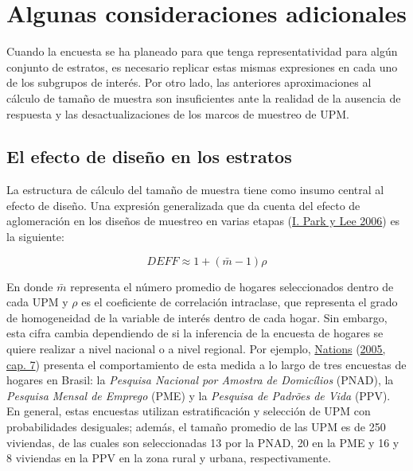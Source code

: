 \documentclass[
  12pt,
  spanish,
]{book}
\begin{document}
\hypertarget{algunas-consideraciones-adicionales}{%
\section{Algunas consideraciones adicionales}\label{algunas-consideraciones-adicionales}}

Cuando la encuesta se ha planeado para que tenga representatividad para algún conjunto de estratos, es necesario replicar estas mismas expresiones en cada uno de los subgrupos de interés. Por otro lado, las anteriores aproximaciones al cálculo de tamaño de muestra son insuficientes ante la realidad de la ausencia de respuesta y las desactualizaciones de los marcos de muestreo de UPM.

\hypertarget{el-efecto-de-diseuxf1o-en-los-estratos}{%
\subsection{El efecto de diseño en los estratos}\label{el-efecto-de-diseuxf1o-en-los-estratos}}

La estructura de cálculo del tamaño de muestra tiene como insumo central al efecto de diseño. Una expresión generalizada que da cuenta del efecto de aglomeración en los diseños de muestreo en varias etapas (\protect\hyperlink{ref-Park_Lee_2006}{I. Park y Lee 2006}) es la siguiente:

\[
DEFF \approx 1 + (\bar{m} - 1)\rho
\]

En donde \(\bar{m}\) representa el número promedio de hogares seleccionados dentro de cada UPM y \(\rho\) es el coeficiente de correlación intraclase, que representa el grado de homogeneidad de la variable de interés dentro de cada hogar. Sin embargo, esta cifra cambia dependiendo de si la inferencia de la encuesta de hogares se quiere realizar a nivel nacional o a nivel regional. Por ejemplo, \protect\hyperlink{ref-United_Nations_2005}{Nations} (\protect\hyperlink{ref-United_Nations_2005}{2005, cap. 7}) presenta el comportamiento de esta medida a lo largo de tres encuestas de hogares en Brasil: la \emph{Pesquisa Nacional por Amostra de Domicílios} (PNAD), la \emph{Pesquisa Mensal de Emprego} (PME) y la \emph{Pesquisa de Padrões de Vida} (PPV). En general, estas encuestas utilizan estratificación y selección de UPM con probabilidades desiguales; además, el tamaño promedio de las UPM es de 250 viviendas, de las cuales son seleccionadas 13 por la PNAD, 20 en la PME y 16 y 8 viviendas en la PPV en la zona rural y urbana, respectivamente.
\end{document}

